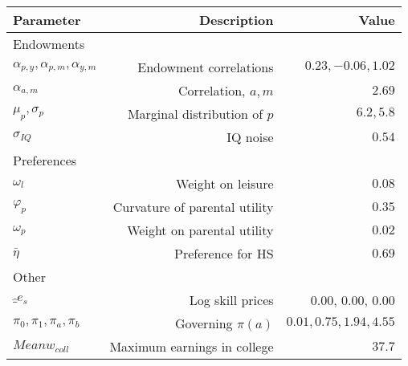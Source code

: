 \begin{tabular}{lrr}
\hline
Parameter & Description  & Value  \\
\hline
Endowments &   &   \\
$\alpha_{p,y}, \alpha_{p,m}, \alpha_{y,m}$ & Endowment correlations  & $0.23, -0.06, 1.02$  \\
$\alpha_{a,m}$ & Correlation, $a,m$  & $2.69$  \\
$\mu_{p}, \sigma_{p}$ & Marginal distribution of $p$  & $6.2, 5.8$  \\
$\sigma_{IQ}$ & IQ noise  & $0.54$  \\
Preferences &   &   \\
$\omega_{l}$ & Weight on leisure  & $0.08$  \\
$\varphi_{p}$ & Curvature of parental utility  & $0.35$  \\
$\omega_{p}$ & Weight on parental utility  & $0.02$  \\
$\bar{\eta}$ & Preference for HS  & $0.69$  \\
Other &   &   \\
$\hat_{e}_{s}$ & Log skill prices  & 0.00, 0.00, 0.00  \\
$\pi_{0}, \pi_{1}, \pi_{a}, \pi_{b}$ & Governing $\pi(a)$  & $0.01, 0.75, 1.94, 4.55$  \\
$Mean w_{coll}$ & Maximum earnings in college  & $37.7$  \\
\hline
\end{tabular}%
